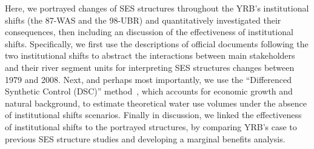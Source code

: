 Here, we portrayed changes of SES structures throughout the YRB's institutional shifts (the 87-WAS and the 98-UBR) and quantitatively investigated their consequences, then including an discussion of the effectiveness of institutional shifts.
Specifically, we first use the descriptions of official documents following the two institutional shifts to abstract the interactions between main stakeholders and their river segment units for interpreting SES structures changes between 1979 and 2008.
Next, and perhaps most importantly, we use the ``Differenced Synthetic Control (DSC)'' method~\cite{arkhangelsky2021}, which accounts for economic growth and natural background, to estimate theoretical water use volumes under the absence of institutional shifts scenarios.
Finally in discussion, we linked the effectiveness of institutional shifts to the portrayed structures, by comparing YRB's case to previous SES structure studies and developing a marginal benefits analysis.

